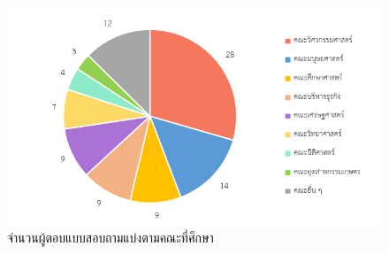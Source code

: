 \begin{figure}
  \begin{center}
    \includegraphics[width=\linewidth]{images/group_by_faculty.png}
  \end{center}
  \caption[จำนวนผู้ตอบแบบสอบถามแบ่งตามคณะที่ศึกษา]{จำนวนผู้ตอบแบบสอบถามแบ่งตามคณะที่ศึกษา}
  \label{fig:faculty}     
\end{figure}

